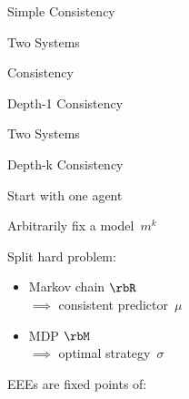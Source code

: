 \begin{frame}{Simple Consistency}
\end{frame}
\begin{frame}{Two Systems}
\end{frame}
\begin{frame}{Consistency}
\end{frame}
\begin{frame}{Depth-1 Consistency}
\end{frame}
\begin{frame}{Two Systems}
\end{frame}
\begin{frame}{Depth-k Consistency}
\end{frame}
\recap
\begin{frame}
Start with one agent

\bigskip\bigskip

Arbitrarily fix a model~\(m^{k}\)

\bigskip\bigskip

Split hard problem:
\begin{itemize}
\item Markov chain \(\rbR\)  \\
\(\implies\) consistent predictor~\(\mu\)
\item MDP \(\rbM\) \\
\(\implies\) optimal strategy~\(\sigma\)
\end{itemize}

\bigskip\bigskip

EEEs are fixed points of:
\end{frame}
